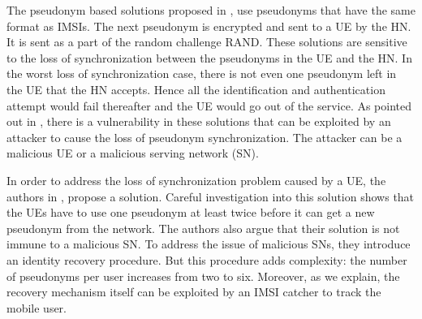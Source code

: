 \documentclass{llncs} %
\begin{document}
The pseudonym based solutions proposed in \cite{CCS15,SSR15}, use pseudonyms that have the same format as IMSIs. The next pseudonym is encrypted and sent to a UE by the HN.  It is sent as a part of the random challenge RAND. These solutions are sensitive to the loss of synchronization between the pseudonyms in the UE and the HN. In the worst loss of synchronization case, there is not even one pseudonym left in the UE that the HN accepts. Hence all the identification and authentication attempt would fail thereafter and the UE would go out of the service. As pointed out in \cite{wisec17}, there is a vulnerability in these solutions that can be exploited by an attacker to cause the loss of pseudonym synchronization. The attacker can be a malicious UE or a malicious serving network (SN).

In order to address the loss of synchronization problem caused by a UE, the authors in \cite{wisec17}, propose a solution. Careful investigation into this solution shows that the UEs have to use one pseudonym at least twice before it can get a new pseudonym from the network. The authors also argue that their solution is not immune to a malicious SN. To address the issue of malicious SNs, they introduce an identity recovery procedure. But this procedure adds complexity: the number of pseudonyms per user increases from two to six. Moreover, as we explain, the recovery mechanism itself can be exploited by an IMSI catcher to track the mobile user.

\end{document}
